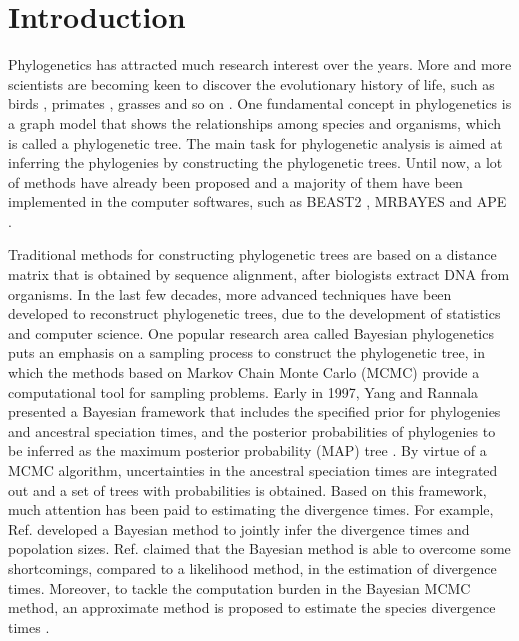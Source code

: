 \documentclass{bmcart}
\begin{document}
\section*{Introduction}
Phylogenetics has attracted much research interest over the years. More and more scientists are becoming keen to discover the evolutionary history of life, such as birds \cite{hackett2008phylogenomic}, primates \cite{szalay2013evolutionary}, grasses \cite{kellogg2001evolutionary} and so on \cite{sawabe2007inferring,garnery1992evolutionary}. One fundamental concept in phylogenetics is a graph model that shows the relationships among species and organisms, which is called a phylogenetic tree. The main task for phylogenetic analysis is aimed at inferring the phylogenies by constructing the phylogenetic trees. Until now, a lot of methods have already been proposed and a majority of them have been implemented in the computer softwares, such as BEAST2 \cite{drummond2007beast, bouckaert2014beast} , MRBAYES \cite{huelsenbeck2001mrbayes} and APE \cite{paradis2004ape}.

Traditional methods for constructing phylogenetic trees are based on a distance matrix that is obtained by sequence alignment, after biologists extract DNA from organisms. In the last few decades, more advanced techniques have been developed to reconstruct phylogenetic trees, due to the development of statistics and computer science. One popular research area called Bayesian phylogenetics puts an emphasis on a sampling process to construct the phylogenetic tree, in which the methods based on Markov Chain Monte Carlo (MCMC) provide a computational tool for sampling problems. Early in 1997, Yang and Rannala presented a Bayesian framework that includes the specified prior for phylogenies and ancestral speciation times, and the posterior probabilities of phylogenies to be inferred as the maximum posterior probability (MAP) tree \cite{yang1997bayesian}. By virtue of a MCMC algorithm, uncertainties in the ancestral speciation times are integrated out and a set of trees with probabilities is obtained. Based on this framework, much attention has been paid to estimating the divergence times. For example, Ref.\cite{rannala2003bayes} developed a Bayesian method to jointly infer the divergence times and popolation sizes. Ref.\cite{yang2003comparison} claimed that the Bayesian method is able to overcome some shortcomings, compared to a likelihood method, in the estimation of divergence times. Moreover, to tackle the computation burden in the Bayesian MCMC method, an approximate method is proposed to estimate the species divergence times \cite{reis2011approximate}.
\end{document}
